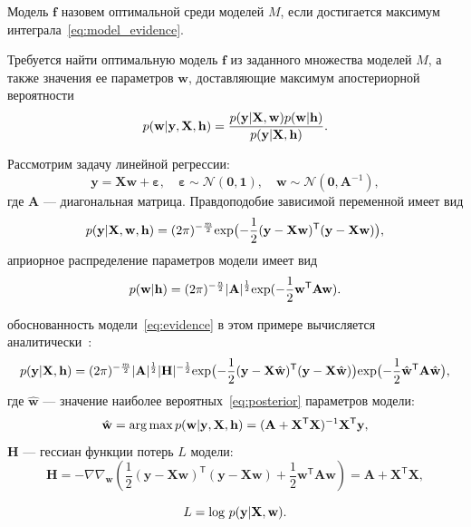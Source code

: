 \begin{defin}Модель  $\mathbf{f}$ назовем оптимальной среди моделей $M$, если достигается максимум интеграла~\eqref{eq:model_evidence}.
\end{defin}


Требуется найти оптимальную модель $\mathbf{f}$ из заданного множества моделей $M$, а также значения ее параметров $\mathbf{w}$, доставляющие максимум апостериорной вероятности
\begin{equation}
\label{eq:var_inf_posterior}
	p(\mathbf{w}|\mathbf{y},\mathbf{X},\mathbf{h}) = \frac{p(\mathbf{y}|\mathbf{X},\mathbf{w})p(\mathbf{w}|\mathbf{h})}{p(\mathbf{y}|\mathbf{X}, \mathbf{h})}.
\end{equation}


\begin{example}
Рассмотрим задачу линейной регрессии:
\[
	\mathbf{y} =\mathbf{X} \mathbf{w} + \boldsymbol{\varepsilon},\quad \boldsymbol{\varepsilon}  \sim \mathcal{N}(\mathbf{0},\mathbf{1}),\quad \mathbf{w} \sim  \mathcal{N}(\mathbf{0},\mathbf{A}^{-1}),
\]
где $\mathbf{A}$ --- диагональная матрица. 
Правдоподобие зависимой переменной имеет вид
\begin{equation}
\label{eq:example1}
	p(\mathbf{y}|  \mathbf{X}, \mathbf{w}, \mathbf{h}) = (2\pi) ^{-\frac{m}{2}} \textnormal{exp} \bigl(-\frac{1}{2}(\mathbf{y} -\mathbf{X} \mathbf{w})^\mathsf{T}(\mathbf{y} - \mathbf{X}\mathbf{w})\bigr),
\end{equation}
априорное распределение параметров модели имеет вид
\begin{equation}
\label{eq:prior}	
p(\mathbf{w}|\mathbf{h}) =  (2\pi) ^{-\frac{n}{2}} |\mathbf{A}|^{\frac{1}{2}} \textnormal{exp} (-\frac{1}{2}\mathbf{w}^\mathsf{T}\mathbf{A}\mathbf{w}).
\end{equation}

обоснованность модели~\eqref{eq:evidence} в этом примере вычисляется аналитически~\cite{hyperopt}:
\begin{equation}
\label{eq:ground}
	p(\mathbf{y}|\mathbf{X},\mathbf{h})  =  (2\pi) ^{-\frac{m}{2}} |\mathbf{A}|^{\frac{1}{2}} |\mathbf{H}|^{-\frac{1}{2}}  \textnormal{exp}\bigl(-\frac{1}{2}(\mathbf{y} -\mathbf{X} \hat{\mathbf{w}})^\mathsf{T}(\mathbf{y} - \mathbf{X}\hat{\mathbf{w}})\bigr)\textnormal{exp} \bigl(-\frac{1}{2}\hat{\mathbf{w}}^\mathsf{T}\mathbf{A}\hat{\mathbf{w}}\bigr),
\end{equation}
где $\hat{\mathbf{w}}$ --- значение наиболее вероятных~\eqref{eq:posterior} параметров модели:
\[
	\hat{\mathbf{w}} = \operatorname*{arg\,max} p(\mathbf{w}|\mathbf{y}, \mathbf{X}, \mathbf{h}) = (\mathbf{A} + \mathbf{X}^\mathsf{T}\mathbf{X})^{-1}\mathbf{X}^\mathsf{T}\mathbf{y},
\]
$\mathbf{H}$ --- гессиан функции потерь $L$ модели:
\[
	\mathbf{H}	= -\nabla \nabla_\mathbf{w} \left(\frac{1}{2} (\mathbf{y} -\mathbf{X} {\mathbf{w}})^\mathsf{T}(\mathbf{y} - \mathbf{X}{\mathbf{w}}) + \frac{1}{2}\mathbf{w}^\mathsf{T}\mathbf{A}\mathbf{w} \right) = \mathbf{A} + \mathbf{X}^\mathsf{T}\mathbf{X},
\]

\[ 
	L = \textnormal{log}~p(\mathbf{y}|\mathbf{X},\mathbf{w}). 
\]
\end{example}

